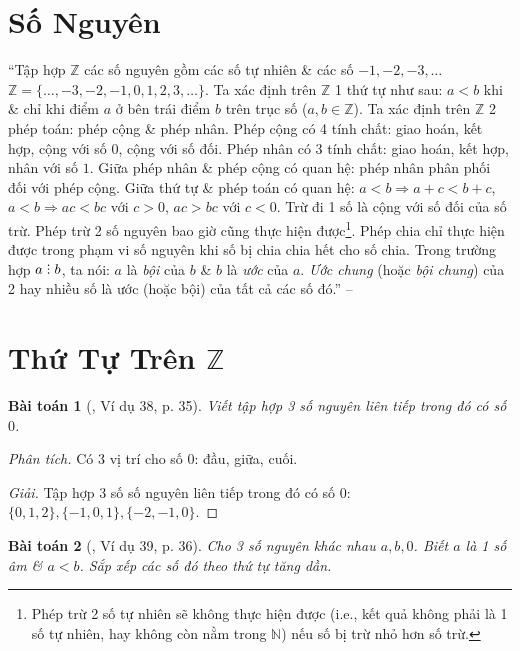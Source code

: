 \documentclass{article}
\numberwithin{equation}{section}
\newtheorem{baitoan}{Bài toán}
\DeclareRobustCommand{\divby}{%
	\mathrel{\vbox{\baselineskip.65ex\lineskiplimit0pt\hbox{.}\hbox{.}\hbox{.}}}%
}
\begin{document}
\section*{Số Nguyên}
``Tập hợp $\mathbb{Z}$ các số nguyên gồm các số tự nhiên \& các số $-1,-2,-3,\ldots$ $\mathbb{Z} = \{\ldots,-3,-2,-1,0,1,2,3,\ldots\}$. Ta xác định trên $\mathbb{Z}$ 1 thứ tự như sau: $a < b$ khi \& chỉ khi điểm $a$ ở bên trái điểm $b$ trên trục số ($a,b\in\mathbb{Z}$). Ta xác định trên $\mathbb{Z}$ 2 phép toán: phép cộng \& phép nhân. Phép cộng có 4 tính chất: giao hoán, kết hợp, cộng với số $0$, cộng với số đối. Phép nhân có 3 tính chất: giao hoán, kết hợp, nhân với số $1$. Giữa phép nhân \& phép cộng có quan hệ: phép nhân phân phối đối với phép cộng. Giữa thứ tự \& phép toán có quan hệ: $a < b\Rightarrow a + c < b + c$, $a < b\Rightarrow ac < bc$ với $c > 0$, $ac > bc$ với $c < 0$. Trừ đi 1 số là cộng với số đối của số trừ. Phép trừ 2 số nguyên bao giờ cũng thực hiện được\footnote{Phép trừ 2 số tự nhiên sẽ không thực hiện được (i.e., kết quả không phải là 1 số tự nhiên, hay không còn nằm trong $\mathbb{N}$) nếu số bị trừ nhỏ hơn số trừ.}. Phép chia chỉ thực hiện được trong phạm vi số nguyên khi số bị chia chia hết cho số chia. Trong trường hợp $a\divby b$, ta nói: $a$ là \textit{bội} của $b$ \& $b$ là \textit{ước} của $a$. \textit{Ước chung} (hoặc \textit{bội chung}) của 2 hay nhiều số là ước (hoặc bội) của tất cả các số đó.'' -- \cite[Chap. II, p. 41]{Binh_Toan_6_tap_1}


\section{Thứ Tự Trên $\mathbb{Z}$}

\begin{baitoan}[\cite{Tuyen_Toan_6}, Ví dụ 38, p. 35]
	Viết tập hợp 3 số nguyên liên tiếp trong đó có số $0$.
\end{baitoan}
\noindent\textit{Phân tích.} Có 3 vị trí cho số $0$: đầu, giữa, cuối.

\begin{proof}[Giải]
	Tập hợp 3 số số nguyên liên tiếp trong đó có số $0$: $\{0,1,2\},\{-1,0,1\},\{-2,-1,0\}$.
\end{proof}

\begin{baitoan}[\cite{Tuyen_Toan_6}, Ví dụ 39, p. 36]
	Cho 3 số nguyên khác nhau $a,b,0$. Biết $a$ là 1 số âm \& $a < b$. Sắp xếp các số đó theo thứ tự tăng dần.
\end{baitoan}
\end{document}
